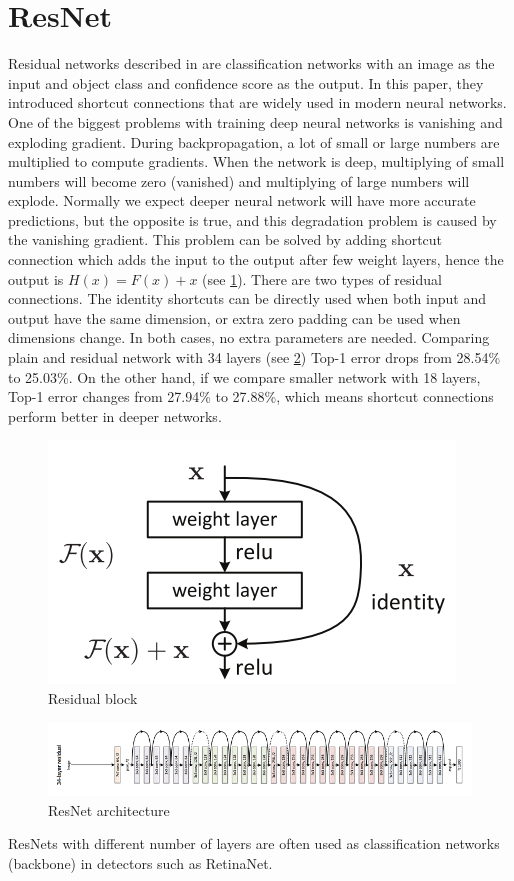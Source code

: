 \documentclass[twoside]{ctuthesis}
\theoremstyle{plain}
\theoremstyle{definition}
\theoremstyle{note}
\begin{document}
\section{ResNet}
Residual networks described in \cite{he_zhang_ren_sun_2016} are classification networks with an image as the input and object class and confidence score as the output. In this paper, they introduced shortcut connections that are widely used in modern neural networks.  One of the biggest problems with training deep neural networks is vanishing and exploding gradient. During backpropagation, a lot of small or large numbers are multiplied to compute gradients. When the network is deep, multiplying of small numbers will become zero (vanished) and multiplying of large numbers will explode. Normally we expect deeper neural network will have more accurate predictions, but the opposite is true, and this degradation problem is caused by the vanishing gradient.
This problem can be solved by adding shortcut connection which adds the input to the output after few weight layers, hence the output is $H(x) = F(x) + x$ (see \ref{resnet_block}). 
There are two types of residual connections. The identity shortcuts can be directly used when both input and output have the same dimension, or extra zero padding can be used when dimensions change. In both cases, no extra parameters are needed. 
Comparing plain and residual network with 34 layers (see \ref{resnet}) Top-1 error drops from 28.54\% to 25.03\%. On the other hand, if we compare smaller network with 18 layers, Top-1 error changes from 27.94\% to 27.88\%, which means shortcut connections perform better in deeper networks. 
\begin{figure}[h]
\caption{Residual block}
\label{resnet_block}
\includegraphics[width=.5\textwidth]{images/used_networks/resnet_block.png}
\end{figure}
\begin{figure}[h]
\caption{ResNet architecture}
\label{resnet}
\includegraphics[width=\textwidth]{images/used_networks/resnet.png}
\end{figure}
ResNets with different number of layers are often used as classification networks (backbone) in detectors such as RetinaNet.  
\end{document}
